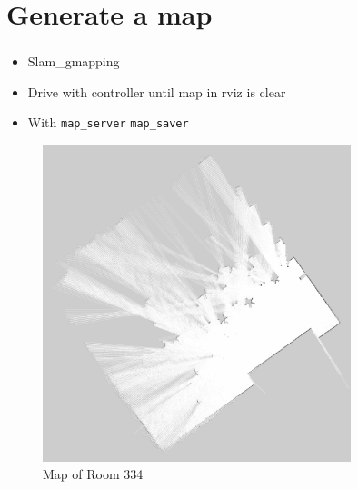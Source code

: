 \documentclass[numberofslides]{AMSBeamer}
\begin{document}
\section{Generate a map}
\begin{frame}[label=agenda]
	\frametitle{\insertsectionhead}%
    \begin{minipage}{0.5\textwidth}
        \begin{itemize}
            \item Slam\_gmapping
            \item Drive with controller until map in rviz is clear
            \item With \texttt{map\_server} \texttt{map\_saver}
        \end{itemize}
    \end{minipage}%
    \begin{minipage}{0.5\textwidth}
        \begin{figure}
            \centering
                \includegraphics[width=0.8\textwidth]{Presentations/LaTeX/images/map334.jpg}
                \caption{Map of Room 334}
            \label{fig:enter-label}
        \end{figure}
        
    \end{minipage}  
\end{frame}
\end{document}
